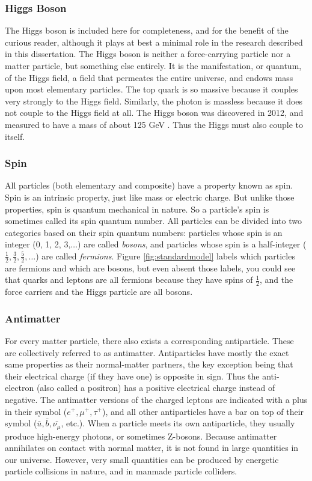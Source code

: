 \subsubsection*{Higgs Boson}
The Higgs boson is included here for completeness, and for the benefit
of the curious reader, although it plays at best a minimal
role in the research described in this dissertation. The Higgs
boson is neither a force-carrying particle nor a matter particle, but
something else entirely. It is the manifestation, or quantum, of the
Higgs field, a field that permeates the entire universe, and endows
mass upon most elementary particles. The top quark is so massive
because it couples very strongly to the Higgs field. Similarly, the
photon is massless because it does not couple to the Higgs field at all.
The Higgs boson was discovered in 2012, and measured to have a mass
of about 125 GeV \cite{jointhiggs}. Thus the Higgs must also couple to itself.

\subsubsection*{Spin}
All particles (both elementary and composite) have
a property known as spin. Spin is an intrinsic property, just like
mass or electric charge. But unlike those properties, spin is quantum
mechanical in nature. So a particle's spin is sometimes called its
spin quantum number. All particles can be divided into two categories
based on their spin quantum numbers: particles whose spin is an
integer (0, 1, 2, 3,$\ldots$) are called \emph{bosons}, and particles whose
spin is a half-integer ($\frac{1}{2}, \frac{3}{2}, \frac{5}{2},\ldots$)
are called \emph{fermions}. Figure \ref{fig:standardmodel}
labels which particles are fermions and which are bosons, but even
absent those labels, you could see that quarks and leptons are all
fermions because they have spins of $\frac{1}{2}$, and the force
carriers and the Higgs particle are all bosons.

\subsubsection*{Antimatter}
For every matter particle, there also exists a corresponding
antiparticle. These are collectively referred to as
antimatter. Antiparticles have mostly the exact same properties as
their normal-matter partners, the key exception being that their electrical charge (if
they have one) is opposite in sign. Thus the anti-electron (also
called a positron) has a positive electrical charge instead of
negative. The antimatter versions of the charged leptons are indicated
with a plus in their symbol ($e^+, \mu^+, \tau^+$), and all other
antiparticles have a bar on top of their symbol ($\bar{u},
\bar{b}, \bar{\nu_{\mu}}$, etc.). When a particle meets its own
antiparticle, they usually produce high-energy photons, or sometimes
Z-bosons. Because antimatter
annihilates on contact with normal matter, it is not found
in large quantities in our universe. However, very small quantities can be
produced by energetic particle collisions in nature, and in manmade
particle colliders.

